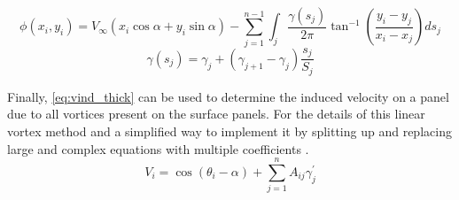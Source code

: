 \begin{equation}
  \label{eq:phi_thick}
    \phi\left(x_{i}, y_{i}\right)=V_{\infty}\left(x_{i} \cos \alpha+y_{i} \sin \alpha\right)-\sum_{j=1}^{n-1} \int_{j} \frac{\gamma\left(s_{j}\right)}{2 \pi} \tan ^{-1}\left(\frac{y_{i}-y_{j}}{x_{i}-x_{j}}\right) d s_{j}
  \end{equation}
  \begin{equation}
    \gamma\left(s_{j}\right)=\gamma_{j}+\left(\gamma_{j+1}-\gamma_{j}\right) \frac{s_{j}}{S_{j}}
    \end{equation}
\medskip


Finally, \cref{eq:vind_thick} can be used to determine the induced velocity on a
panel due to all vortices present on the surface panels. For the details of this
linear vortex method and a simplified way to implement it by splitting up and
replacing large and complex equations with multiple coefficients
\citeauthor{kuethe_chow_1998}\cite{kuethe_chow_1998}
.
\begin{equation}
  \label{eq:vind_thick}
  V_{i}=\cos \left(\theta_{i}-\alpha\right)+\sum_{j=1}^{n} A_{i j} \gamma_{j}^{\prime}
  \end{equation}


